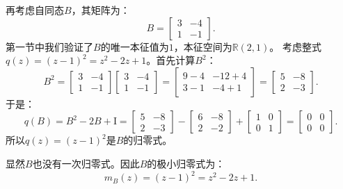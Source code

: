 \documentclass[12pt,UTF8,fontset=none]{ctexbook}
\begin{document}
再考虑自同态$B$，其矩阵为：
$$
B = \begin{bmatrix} 3 & -4 \\ 1 & -1 \end{bmatrix}.
$$
第一节中我们验证了$B$的唯一本征值为$1$，本征空间为$\mathbb{R}(2,1)$。
考虑整式$q(z) = (z-1)^2 = z^2 - 2z + 1$。首先计算$B^2$：
$$
B^2 = \begin{bmatrix} 3 & -4 \\ 1 & -1 \end{bmatrix}\begin{bmatrix} 3 & -4 \\ 1 & -1 \end{bmatrix} = \begin{bmatrix} 9-4 & -12+4 \\ 3-1 & -4+1 \end{bmatrix} = \begin{bmatrix} 5 & -8 \\ 2 & -3 \end{bmatrix}.
$$
于是：
$$
q(B) = B^2 - 2B + \mathrm{I} = \begin{bmatrix} 5 & -8 \\ 2 & -3 \end{bmatrix} - \begin{bmatrix} 6 & -8 \\ 2 & -2 \end{bmatrix} + \begin{bmatrix} 1 & 0 \\ 0 & 1 \end{bmatrix} = \begin{bmatrix} 0 & 0 \\ 0 & 0 \end{bmatrix}.
$$
所以$q(z) = (z-1)^2$是$B$的归零式。

显然$B$也没有一次归零式。因此$B$的极小归零式为：
$$
m_B(z) = (z-1)^2 = z^2 - 2z + 1.
$$
\end{document}
